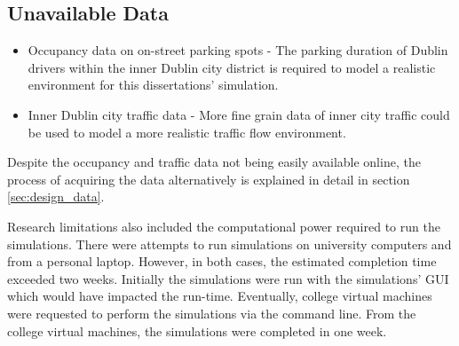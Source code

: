 \subsection*{Unavailable Data}
\begin{itemize}
    \item Occupancy data on on-street parking spots - The parking duration of Dublin drivers within the inner Dublin city district is required to model a realistic environment for this dissertations' simulation.
    \item Inner Dublin city traffic data - More fine grain data of inner city traffic could be used to model a more realistic traffic flow environment.
\end{itemize}

Despite the occupancy and traffic data not being easily available online, the process of acquiring the data alternatively is explained in detail in section \ref{sec:design_data}.

Research limitations also included the computational power required to run the simulations. There were attempts to run simulations on university computers and from a personal laptop. However, in both cases, the estimated completion time exceeded two weeks. Initially the simulations were run with the simulations' GUI which would have impacted the run-time. Eventually, college virtual machines were requested to perform the simulations via the command line. From the college virtual machines, the simulations were completed in one week.